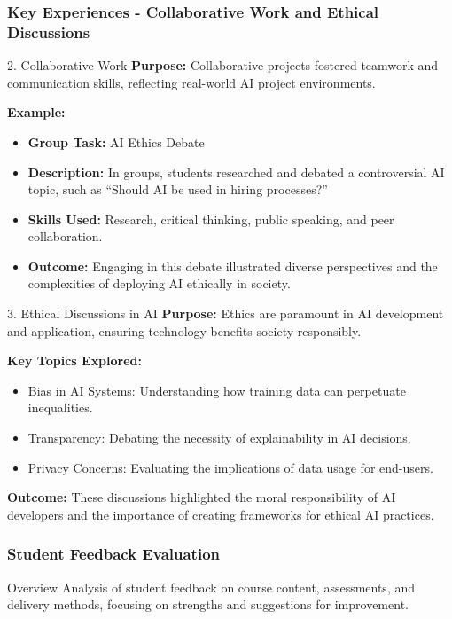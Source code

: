 \documentclass[aspectratio=169]{beamer}
\begin{document}
\begin{frame}[fragile]
  \frametitle{Key Experiences - Collaborative Work and Ethical Discussions}
  \begin{block}{2. Collaborative Work}
    \textbf{Purpose:} Collaborative projects fostered teamwork and communication skills, reflecting real-world AI project environments.
    
    \textbf{Example:}
    \begin{itemize}
      \item \textbf{Group Task:} AI Ethics Debate
      \item \textbf{Description:} In groups, students researched and debated a controversial AI topic, such as “Should AI be used in hiring processes?”
      \item \textbf{Skills Used:} Research, critical thinking, public speaking, and peer collaboration.
      \item \textbf{Outcome:} Engaging in this debate illustrated diverse perspectives and the complexities of deploying AI ethically in society.
    \end{itemize}
  \end{block}

  \begin{block}{3. Ethical Discussions in AI}
    \textbf{Purpose:} Ethics are paramount in AI development and application, ensuring technology benefits society responsibly.
    
    \textbf{Key Topics Explored:}
    \begin{itemize}
      \item Bias in AI Systems: Understanding how training data can perpetuate inequalities.
      \item Transparency: Debating the necessity of explainability in AI decisions.
      \item Privacy Concerns: Evaluating the implications of data usage for end-users.
    \end{itemize}
    
    \textbf{Outcome:} These discussions highlighted the moral responsibility of AI developers and the importance of creating frameworks for ethical AI practices.
  \end{block}
\end{frame}

\begin{frame}[fragile]
    \frametitle{Student Feedback Evaluation}
    \begin{block}{Overview}
        Analysis of student feedback on course content, assessments, and delivery methods, focusing on strengths and suggestions for improvement.
    \end{block}
\end{frame}
\end{document}
